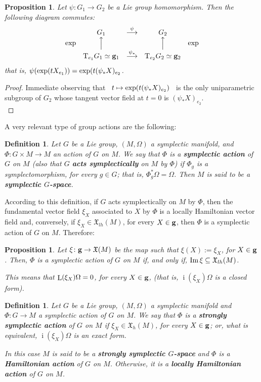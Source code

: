 \documentclass[12pt]{report}
\newtheorem{prop}[teor]{Proposition}
\newtheorem{definition}[teor]{Definition}
\def\mapping#1{\mathrel{\mathop{\longrightarrow}\limits^{#1}}}
\def\qed{\ifvmode\removelastskip\fi
{\unskip\nobreak\hfil\penalty50\hbox{}\nobreak\hfil
\hbox{\vrule height1.2ex width1.2ex}\parfillskip=0pt
\finalhyphendemerits=0 \par\smallskip}}
\def\vf{\mathfrak X}
\def\Tan{{\rm T}}
\def\Lie{\mathop{\rm L}\nolimits}
\def\inn{\mathop{i}\nolimits}
\begin{document}
\begin{prop}
Let $\psi \colon G_1 \to G_2$ be a Lie group homomorphism.
Then the following diagram commutes:
$$
\begin{array}{ccccc}
& G_1 & \mapping{\psi} & G_2 &
\\
{\rm exp} & \Big\uparrow & & \Big\uparrow & {\rm exp}
\\
& \Tan_{e_1}G_1 \simeq {\bf g}_1 & \mapping{\psi_*} 
& \Tan_{e_2}G_2 \simeq {\bf g}_2 &
\end{array}
$$
that is,
$\psi({\rm exp}(tX_{e_1})) = {\rm exp}(t(\psi_*X)_{e_2}$.
\label{conmutexp}
\end{prop}
\begin{proof}
Immediate observing that  \
$t \mapsto {\rm exp}(t(\psi_*X)_{e_2})$ \ 
is the only uniparametric subgroup of $G_2$
whose tangent vector field at $t=0$ is $(\psi_*X)_{e_2}$.
\\ \qed  \end{proof}

A very relevant type of group actions are the following:

\begin{definition}
Let $G$ be a Lie group, $(M,\Omega)$ a symplectic manifold, and
$\Phi \colon G\times M \to M$ an action of $G$ on $M$.
We say that $\Phi$ is a \textbf{symplectic action} of $G$ on $M$
(also that $G$  \textbf{acts symplectically} on $M$ by $\Phi$)
if $\Phi_g$ is a symplectomorphism, for every $g \in G$;
that is, $\Phi_g^*\Omega = \Omega$.
Then $M$ is said to be a \textbf{symplectic $G$-space}.
\end{definition}

According to this definition, if $G$ acts symplectically on $M$ by $\Phi$,
then the fundamental vector field $\xi_X$ associated to $X$ by $\Phi$ 
is a locally Hamiltonian vector field and, conversely,
if  $\xi_X\in\vf_{lh}(M)$, for every $X \in{\bf g}$, then 
$\Phi$ is a symplectic action of $G$ on $M$. Therefore:

\begin{prop}
Let $\xi\colon{\bf g}\to\vf(M)$ be the map such that 
$\xi(X):=\xi_X$, for $X\in {\bf g}$.
Then, $\Phi$ is a symplectic action of $G$ on $M$ if, and only if,
${\rm Im}\,\xi\subseteq\vf_{lh}(M)$.

This means that
$\Lie(\xi_X)\Omega = 0$, for every $X \in {\bf g}$,
(that is, $\inn(\xi_X)\Omega$ is a closed form).
\end{prop}

\begin{definition}
Let $G$ be a Lie group, $(M,\Omega )$ a symplectic manifold and
$\Phi \colon G \to M$ a symplectic action of $G$ on $M$.
We say that $\Phi$ is a \textbf{strongly symplectic action} of $G$ on $M$ 
if $\xi_X\in\vf_{h}(M)$, for every $X \in{\bf g}$;
or, what is equivalent, $\inn(\xi_X)\Omega$ is an exact form.

In this case $M$ is said to be a
\textbf{strongly symplectic $G$-space} and
$\Phi$ is a \textbf{Hamiltonian action} of $G$ on $M$.
Otherwise, it is a \textbf{locally Hamiltonian action} of $G$ on $M$.
\end{definition}
\end{document}

